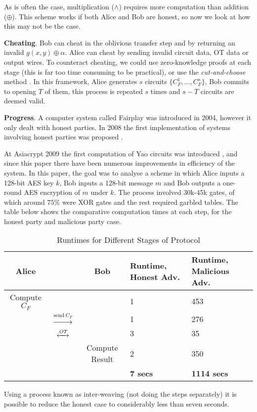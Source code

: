 \documentclass[11pt]{article}
\begin{document}
As is often the case, multiplication ($\wedge$) requires more computation than addition ($\oplus$). This scheme works if both Alice and Bob are honest, so now we look at how this may not be the case.
\medskip

\noindent\textbf{Cheating}. Bob can cheat in the oblivious transfer step and by returning an invalid $g(x,y) \oplus \alpha$. Alice can cheat by sending invalid circuit data, OT data or output wires. To counteract cheating, we could use zero-knowledge proofs at each stage (this is far too time consuming to be practical), or use the \emph{cut-and-choose} method \cite{Lindell2007}. In this framework, Alice generates $s$ circuits $\{C_F^1,...,C_F^s\}$, Bob commits to opening $T$ of them, this process is repeated $s$ times and $s-T$ circuits are deemed valid.
\medskip

\noindent\textbf{Progress}. A computer system called Fairplay \cite{Malkhi2004} was introduced in 2004, however it only dealt with honest parties. In 2008 the first implementation of systems involving honest parties was proposed \cite{Lindell2008}.

At Asiacrypt 2009 the first computation of Yao circuits was introduced \cite{Pinkas2009}, and since this paper there have been numerous improvements in efficiency of the system. In this paper, the goal was to analyse a scheme in which Alice inputs a 128-bit AES key $k$, Bob inputs a 128-bit message $m$ and Bob outputs a one-round AES encryption of $m$ under $k$. The process involved 30k-45k gates, of which around $75\%$ were XOR gates and the rest required garbled tables. The table below shows the comparative computation times at each step, for the honest party and malicious party case. 
\medskip

\begin{table}[h]
\begin{tabular}{|c c c | p{2.1cm} | p{3.4cm}|} 
 \hline
 Alice & & Bob & Runtime, Honest Adv. & Runtime, Malicious Adv. \\ \hline
 Compute $C_F$ & & & 1 & 453 \\
  & $\xrightarrow{\text{send}~C_F}$ & & 1 & 276 \\
  & $\xleftrightarrow{OT}$ & & 3 & 35 \\
  & & Compute Result & 2 & 350 \\ \hline
  & & & \textbf{7 secs} & \textbf{1114 secs} \\
 \hline
\end{tabular}
\caption{Runtimes for Different Stages of Protocol}
\end{table}

Using a process known as inter-weaving (not doing the steps separately) it is possible to reduce the honest case to considerably less than seven seconds. 



\end{document}
